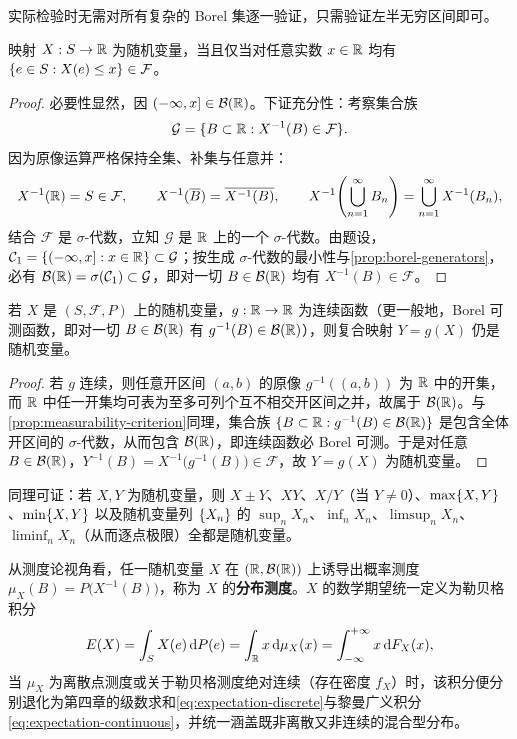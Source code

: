 实际检验时无需对所有复杂的 Borel 集逐一验证，只需验证左半无穷区间即可。

\begin{proposition}[可测性的等价判别准则]
\label{prop:measurability-criterion}
映射 $X:S\to\mathbb{R}$ 为随机变量，当且仅当对任意实数 $x\in\mathbb{R}$ 均有 $\{e\in S: X(e)\le x\}\in\mathcal{F}$。
\end{proposition}
\begin{proof}
必要性显然，因 $(-\infty,x]\in\mathcal{B}(\mathbb{R})$。下证充分性：考察集合族
\[
  \mathcal{G}=\{B\subset\mathbb{R}: X^{-1}(B)\in\mathcal{F}\}.
\]
因为原像运算严格保持全集、补集与任意并：
\[
  X^{-1}(\mathbb{R})=S\in\mathcal{F},\qquad
  X^{-1}(\overline{B})=\overline{X^{-1}(B)},\qquad
  X^{-1}\!\left(\bigcup_{n=1}^{\infty}B_n\right)=\bigcup_{n=1}^{\infty}X^{-1}(B_n),
\]
结合 $\mathcal{F}$ 是 $\sigma$-代数，立知 $\mathcal{G}$ 是 $\mathbb{R}$ 上的一个 $\sigma$-代数。由题设，$\mathcal{C}_1=\{(-\infty,x]:x\in\mathbb{R}\}\subset\mathcal{G}$；按生成 $\sigma$-代数的最小性与\cref{prop:borel-generators}，必有 $\mathcal{B}(\mathbb{R})=\sigma(\mathcal{C}_1)\subset\mathcal{G}$，即对一切 $B\in\mathcal{B}(\mathbb{R})$ 均有 $X^{-1}(B)\in\mathcal{F}$。
\end{proof}

\begin{proposition}[复合函数的可测性]
\label{prop:measurable-composition}
若 $X$ 是 $(S,\mathcal{F},P)$ 上的随机变量，$g:\mathbb{R}\to\mathbb{R}$ 为连续函数（更一般地，Borel 可测函数，即对一切 $B\in\mathcal{B}(\mathbb{R})$ 有 $g^{-1}(B)\in\mathcal{B}(\mathbb{R})$），则复合映射 $Y=g(X)$ 仍是随机变量。
\end{proposition}
\begin{proof}
若 $g$ 连续，则任意开区间 $(a,b)$ 的原像 $g^{-1}((a,b))$ 为 $\mathbb{R}$ 中的开集，而 $\mathbb{R}$ 中任一开集均可表为至多可列个互不相交开区间之并，故属于 $\mathcal{B}(\mathbb{R})$。与\cref{prop:measurability-criterion}同理，集合族 $\{B\subset\mathbb{R}:g^{-1}(B)\in\mathcal{B}(\mathbb{R})\}$ 是包含全体开区间的 $\sigma$-代数，从而包含 $\mathcal{B}(\mathbb{R})$，即连续函数必 Borel 可测。于是对任意 $B\in\mathcal{B}(\mathbb{R})$，$Y^{-1}(B)=X^{-1}\bigl(g^{-1}(B)\bigr)\in\mathcal{F}$，故 $Y=g(X)$ 为随机变量。
\end{proof}

同理可证：若 $X,Y$ 为随机变量，则 $X\pm Y$、$XY$、$X/Y$（当 $Y\ne 0$）、$\max\{X,Y\}$、$\min\{X,Y\}$ 以及随机变量列 $\{X_n\}$ 的 $\sup_n X_n$、$\inf_n X_n$、$\limsup_n X_n$、$\liminf_n X_n$（从而逐点极限）全都是随机变量。

从测度论视角看，任一随机变量 $X$ 在 $(\mathbb{R},\mathcal{B}(\mathbb{R}))$ 上诱导出概率测度 $\mu_X(B)=P\bigl(X^{-1}(B)\bigr)$，称为 $X$ 的\textbf{分布测度}。$X$ 的数学期望统一定义为勒贝格积分
\[
  E(X)=\int_{S}X(e)\mathop{}\!\mathrm{d} P(e)=\int_{\mathbb{R}}x\mathop{}\!\mathrm{d}\mu_X(x)=\int_{-\infty}^{+\infty}x\mathop{}\!\mathrm{d} F_X(x),
\]
当 $\mu_X$ 为离散点测度或关于勒贝格测度绝对连续（存在密度 $f_X$）时，该积分便分别退化为第四章的级数求和\eqref{eq:expectation-discrete}与黎曼广义积分\eqref{eq:expectation-continuous}，并统一涵盖既非离散又非连续的混合型分布。

